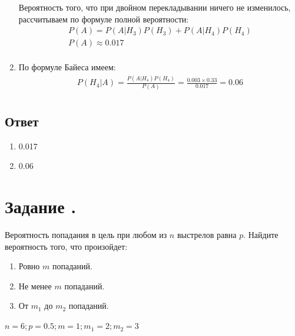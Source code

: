 \documentclass[12pt]{article}
\begin{document}
\begin{enumerate}
\begin{equation*}
	      \end{equation*}
	      Вероятность того, что при двойном перекладывании ничего не изменилось, рассчитываем по формуле полной вероятности:
	      \begin{gather*}
		      P(A) = P(A|H_3)P(H_3) + P(A|H_4)P(H_4) \\
		      P(A) \approx 0.017 \\
	      \end{gather*}
	\item По формуле Байеса имеем:
	      \begin{gather*}
		      P(H_4|A) = \frac{P(A|H_4)P(H_4)}{P(A)} = \frac{0.003 \times 0.33}{0.017} = 0.06 \\
	      \end{gather*}
\end{enumerate}
\subsection*{Ответ}
\begin{enumerate}
	\item 0.017
	\item 0.06
\end{enumerate}

\section*{Задание .}
Вероятность попадания в цель при любом из $n$ выстрелов равна $p$. Найдите вероятность того, что произойдет:
\begin{enumerate}
	\item Ровно $m$ попаданий.
	\item Не менее $m$ попаданий.
	\item От $m_1$ до $m_2$ попаданий.
\end{enumerate}
$n=6; p=0.5; m=1; m_1=2; m_2=3$
\end{document}
